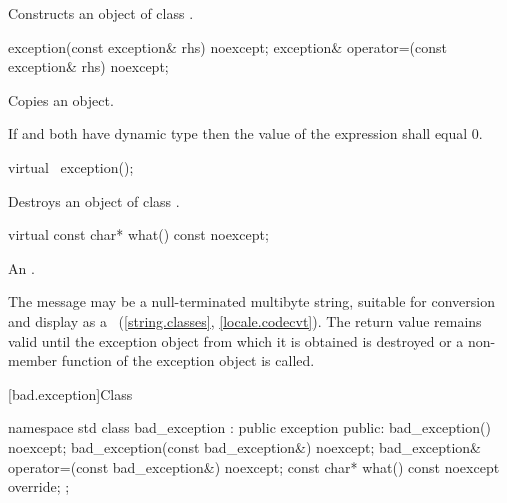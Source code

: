 \begin{itemdescr}
\pnum
\effects
Constructs an object of class
.
\end{itemdescr}

%
%
\begin{itemdecl}
exception(const exception& rhs) noexcept;
exception& operator=(const exception& rhs) noexcept;
\end{itemdecl}

\begin{itemdescr}
\pnum
\effects
Copies an
object.

\pnum
\ensures If  and  both have dynamic type 
then the value of the expression  shall equal 0.
\end{itemdescr}

%
\begin{itemdecl}
virtual ~exception();
\end{itemdecl}

\begin{itemdescr}
\pnum
\effects
Destroys an object of class
.
\end{itemdescr}

%
\begin{itemdecl}
virtual const char* what() const noexcept;
\end{itemdecl}

\begin{itemdescr}
\pnum
\returns
An  \ntbs{}.

\pnum
\remarks
The message may be a null-terminated multibyte string,
suitable for conversion and display as a
~(\ref{string.classes}, \ref{locale.codecvt}).
The return value remains valid until the exception object from which
it is obtained is destroyed or a non-
member function of the exception object is called.
\end{itemdescr}

[bad.exception]{Class }

%
\begin{codeblock}
namespace std {
  class bad_exception : public exception {
  public:
    bad_exception() noexcept;
    bad_exception(const bad_exception&) noexcept;
    bad_exception& operator=(const bad_exception&) noexcept;
    const char* what() const noexcept override;
  };
}
\end{codeblock}

